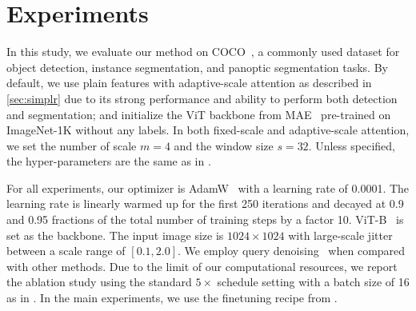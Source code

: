 
\section{Experiments}
\label{sec:experiments}

 In this study, we evaluate our method on COCO~\cite{lin2014mscoco}, a commonly used dataset for object detection, instance segmentation, and panoptic segmentation tasks. By default, we use plain features with adaptive-scale attention as described in \cref{sec:simplr} due to its strong performance and ability to perform both detection and segmentation; and initialize the ViT backbone from MAE~\cite{he2022mae} pre-trained on ImageNet-1K without any labels. In both fixed-scale and adaptive-scale attention, we set the number of scale $m=4$ and the window size $s=32$. Unless specified, the hyper-parameters are the same as in \cite{nguyen2022boxer}.

For all experiments, our optimizer is AdamW~\cite{loshchilov2019adamw} with a learning rate of 0.0001. The learning rate is linearly warmed up for the first 250 iterations and decayed at 0.9 and 0.95 fractions of the total number of training steps by a factor 10. ViT-B~\cite{dosovitskiy2021vit} is set as the backbone. The input image size is $1024\times1024$ with large-scale jitter \cite{shiasi2021lsjitter} between a scale range of $[0.1, 2.0]$. We employ query denoising~\cite{zhang2023dino} when compared with other methods. Due to the limit of our computational resources, we report the ablation study using the standard $5\times$ schedule setting with a batch size of 16 as in \cite{nguyen2022boxer}. In the main experiments, we use the finetuning recipe from \cite{li2022vitdet}.


